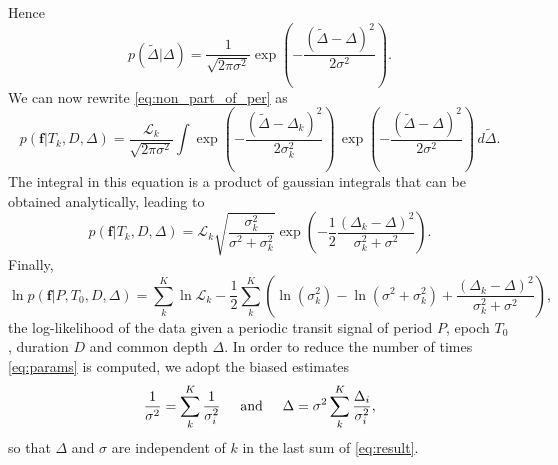 \documentclass{aastex631}
\begin{document}
Hence
\begin{equation*}
    p(\tilde\Delta | \Delta) = \frac{1}{\sqrt{2\pi\sigma^2}}\exp \left(-\frac{(\tilde\Delta-\Delta)^2}{2\sigma^2}\right).
\end{equation*}
We can now rewrite \autoref{eq:non_part_of_per} as
\begin{equation*}
    p(\bm{f} \vert T_k, D, \Delta) =  \frac{\mathcal{L}_k}{\sqrt{2\pi\sigma^2}} \int \exp\left(-\frac{(\tilde\Delta-\Delta_k)^2}{2\sigma_k^2}\right)\, \exp\left(-\frac{(\tilde\Delta-\Delta)^2}{2\sigma^2}\right)\, d\tilde\Delta.
\end{equation*}
The integral in this equation is a product of gaussian integrals that can be obtained analytically, leading to
\begin{equation*}
    p(\bm{f} \vert T_k, D, \Delta) = \mathcal{L}_k  \sqrt{\frac{\sigma_{k}^2}{\sigma^{2} + \sigma_{k}^{2}}} \exp\left(-\frac{1}{2}\frac{(\Delta_k-\Delta)^2}{\sigma_k^2 + \sigma^2}\right).
\end{equation*}
Finally,
\begin{equation}
    \ln p(\bm{f} \vert P, T_0 ,D, \Delta) =  \sum_{k}^K \ln \mathcal{L}_k  - \frac{1}{2} \sum_k^K\left(\ln(\sigma_{k}^2) - \ln(\sigma^{2} + \sigma_{k}^{2}) +  \frac{\left(\Delta_{k} -
    \Delta\right)^{2}}{\sigma_k^{2} + \sigma^{2}}\right),
\end{equation}
the log-likelihood of the data given a periodic transit signal of period $P$, epoch $T_0$, duration $D$ and common depth $\Delta$. In order to reduce the number of times \autoref{eq:params} is computed, we adopt the biased estimates
\begin{equation}\label{eq:sigma_delta}
    \frac{1}{\sigma^2} = \sum_{k}^K \frac{1}{\sigma_i^2} \hspace{0.5cm}\text{and}\hspace{0.5cm} \Delta  = \sigma^2 \sum_{k}^K {\frac{\Delta_i}{\sigma_i^2}},
\end{equation}
so that $\Delta$ and $\sigma$ are independent of $k$ in the last sum of \autoref{eq:result}.



\end{document}

